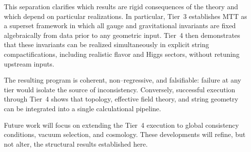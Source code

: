 \documentclass[11pt]{article}
\begin{document}
This separation clarifies which results are rigid consequences of the
theory and which depend on particular realizations.
In particular, Tier~3 establishes MTT as a superset framework in which
all gauge and gravitational invariants are fixed algebraically from data
prior to any geometric input.
Tier~4 then demonstrates that these invariants can be realized
simultaneously in explicit string compactifications, including realistic
flavor and Higgs sectors, without retuning upstream inputs.

The resulting program is coherent, non--regressive, and falsifiable:
failure at any tier would isolate the source of inconsistency.
Conversely, successful execution through Tier~4 shows that topology,
effective field theory, and string geometry can be integrated into a
single calculational pipeline.

Future work will focus on extending the Tier~4 execution to global
consistency conditions, vacuum selection, and cosmology.
These developments will refine, but not alter, the structural results
established here.
\end{document}
